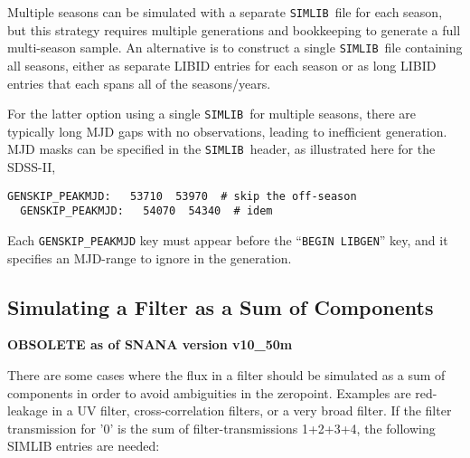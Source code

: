 \documentclass[12pt]{article}
\newcommand{\simlib}{{\tt SIMLIB}}
\begin{document}
{Multiple seasons can be simulated with a separate \simlib\ file
for each season, but this strategy requires multiple generations
and bookkeeping to generate a full multi-season sample. 
An alternative is to construct a single \simlib\ file containing 
all seasons, either as separate LIBID entries for each season
or as long LIBID entries that each spans all of
the seasons/years.

For the latter option using a single \simlib\ for multiple seasons,
there are typically long MJD gaps with no observations, leading
to inefficient generation. MJD masks can be specified in the
\simlib\ header, as illustrated here for the SDSS-II,
%
\begin{Verbatim}[frame=single]
  GENSKIP_PEAKMJD:   53710  53970  # skip the off-season
  GENSKIP_PEAKMJD:   54070  54340  # idem
\end{Verbatim}
%
Each {\tt GENSKIP\_PEAKMJD} key must appear before the
``{\tt BEGIN LIBGEN}'' key, and it specifies an MJD-range
to ignore in the generation.

   \clearpage
   \subsection{Simulating a Filter as a Sum of Components}
   \label{subsec:filterSum}

{\Large\bf OBSOLETE as of SNANA version v10\_50m}
\medskip

There are some cases where the flux in a filter should be 
simulated as a sum of components in order to avoid ambiguities 
in the zeropoint. Examples are red-leakage in a UV filter,
cross-correlation filters, or a very broad filter.
If the filter transmission for '0' is the sum of 
filter-transmissions 1+2+3+4, the following SIMLIB 
entries are needed:

}
\end{document}
